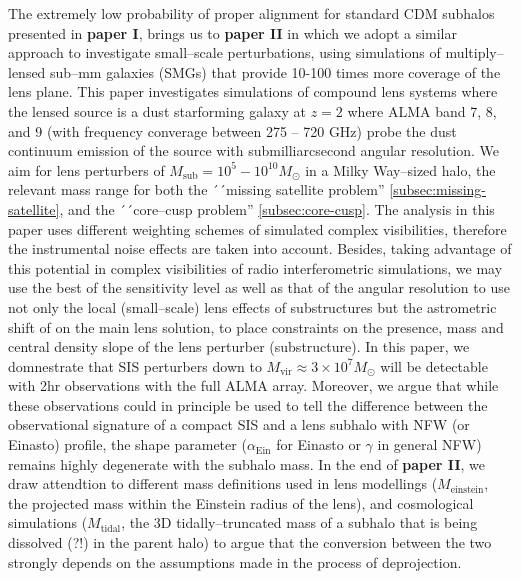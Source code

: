 \documentclass[paper=a4, fontsize=11pt]{scrartcl} %
\numberwithin{equation}{section} %
\numberwithin{figure}{section} %
\numberwithin{table}{section} %
\begin{document}
The extremely low probability of proper alignment for standard CDM subhalos presented in {\bf paper I}, brings us to {\bf paper II} in which we adopt a similar approach to investigate small--scale perturbations, using simulations of multiply--lensed sub--mm galaxies (SMGs) that provide 10-100 times more coverage of the lens plane. This paper investigates simulations of compound lens systems where the lensed source is a dust starforming galaxy at $z = 2$ where ALMA band 7, 8, and 9 (with frequency converage between 275 -- 720 GHz) probe the dust continuum emission of the source with submilliarcsecond angular resolution.  We aim for lens perturbers of $M_\mathrm{sub} = 10^5 - 10^{10} M_\odot$ in a Milky Way--sized halo, the relevant mass range for both the ´´missing satellite problem'' \ref{subsec:missing-satellite}, and the ´´core--cusp problem'' \ref{subsec:core-cusp}. The analysis in this paper uses different weighting schemes of simulated complex visibilities, therefore the instrumental noise effects are taken into account. Besides, taking advantage of this potential in complex visibilities of radio interferometric simulations, we may use the best of the sensitivity level as well as that of the angular resolution to use not only the local (small--scale) lens effects of substructures but the astrometric shift of on the main lens solution, to place constraints on the presence, mass and central density slope of the lens perturber (substructure). In this paper, we domnestrate that SIS perturbers down to $M_\mathrm{vir} \approx 3\times 10^7 M_\odot$ will be detectable with 2hr observations with the full ALMA array. Moreover, we argue that while these observations could in principle be used to tell the difference between the observational signature of a compact SIS and a lens subhalo with NFW (or Einasto) profile, the shape parameter ($\alpha_\mathrm{Ein}$ for Einasto or $\gamma$ in general NFW) remains highly degenerate with the subhalo mass. In the end of {\bf paper II}, we draw attendtion to different mass definitions used in lens modellings ($M_\mathrm{einstein}$, the projected mass within the Einstein radius of the lens), and cosmological simulations ($M_\mathrm{tidal}$, the 3D tidally--truncated mass of a subhalo that is being dissolved (?!) in the parent halo) to argue that the conversion between the two strongly depends on the assumptions made in the process of deprojection. 
\end{document}
